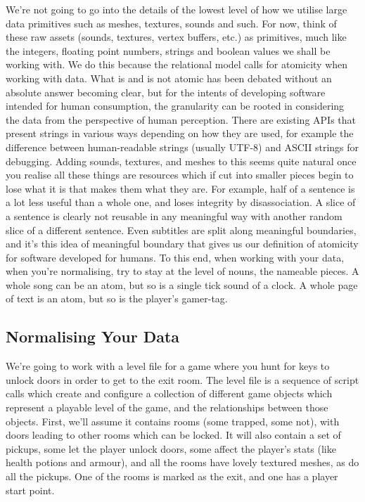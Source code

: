 \documentclass[a4paper,12pt]{article}
\begin{document}
We're not going to go into the details of the lowest level of how we utilise large data primitives such as meshes, textures, sounds and such.
For now, think of these raw assets (sounds, textures, vertex buffers, etc.) as primitives, much like the integers, floating point numbers, strings and boolean values we shall be working with.
We do this because the relational model calls for atomicity when working with data.
What is and is not atomic has been debated without an absolute answer becoming clear, but for the intents of developing software intended for human consumption, the granularity can be rooted in considering the data from the perspective of human perception.
There are existing APIs that present strings in various ways depending on how they are used, for example the difference between human-readable strings (usually UTF-8) and ASCII strings for debugging.
Adding sounds, textures, and meshes to this seems quite natural once you realise all these things are resources which if cut into smaller pieces begin to lose what it is that makes them what they are.
For example, half of a sentence is a lot less useful than a whole one, and loses integrity by disassociation.
A slice of a sentence is clearly not reusable in any meaningful way with another random slice of a different sentence.
Even subtitles are split along meaningful boundaries, and it's this idea of meaningful boundary that gives us our definition of atomicity for software developed for humans.
To this end, when working with your data, when you're normalising, try to stay at the level of nouns, the nameable pieces.
A whole song can be an atom, but so is a single tick sound of a clock.
A whole page of text is an atom, but so is the player's gamer-tag.

\subsection{Normalising Your Data}

We're going to work with a level file for a game where you hunt for keys to unlock doors in order to get to the exit room.
The level file is a sequence of script calls which create and configure a collection of different game objects which represent a playable level of the game, and the relationships between those objects.
First, we'll assume it contains rooms (some trapped, some not), with doors leading to other rooms which can be locked.
It will also contain a set of pickups, some let the player unlock doors, some affect the player's stats (like health potions and armour), and all the rooms have lovely textured meshes, as do all the pickups.
One of the rooms is marked as the exit, and one has a player start point.
\end{document}
